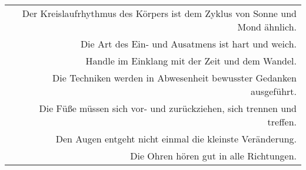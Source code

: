 \begin{footnotesize}
\begin{tabularx}{\textwidth}{Xr}
		\hfill & Der Kreislaufrhythmus des Körpers ist dem Zyklus von Sonne und Mond ähnlich. \\
		\hfill & Die Art des Ein- und Ausatmens ist hart und weich. \\
		\hfill & Handle im Einklang mit der Zeit und dem Wandel. \\
		\hfill & Die Techniken werden in Abwesenheit bewusster Gedanken ausgeführt. \\
		\hfill & Die Füße müssen sich vor- und zurückziehen, sich trennen und treffen. \\
		\hfill & Den Augen entgeht nicht einmal die kleinste Veränderung. \\
		\hfill & Die Ohren hören gut in alle Richtungen. \\
	\end{tabularx}
	\end{footnotesize}